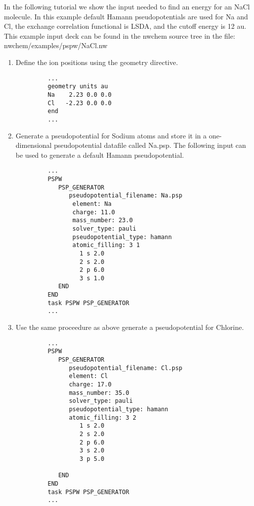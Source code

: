 In the following tutorial we show the input needed to find an
energy for an NaCl molecule.  In this example default Hamann pseudopotentials
are used for Na and Cl, the exchange correlation functional is LSDA, and
the cutoff energy is 12 au.  This example input deck can be found in the nwchem
source tree in the file: nwchem/examples/pspw/NaCl.nw
\begin{enumerate}
\item Define the ion positions using the geometry directive.
 \tiny     \begin{verbatim}
         ...
         geometry units au 
         Na    2.23 0.0 0.0
         Cl   -2.23 0.0 0.0
         end
         ...
      \end{verbatim}
\normalsize
\item Generate a pseudopotential for Sodium atoms and store it in a
      one-dimensional pseudopotential datafile called Na.psp.  
      The following input can be used to generate a default
      Hamann pseudopotential.  
 \tiny     \begin{verbatim}
         ...
         PSPW
            PSP_GENERATOR
               pseudopotential_filename: Na.psp
                element: Na
                charge: 11.0
                mass_number: 23.0
                solver_type: pauli
                pseudopotential_type: hamann
                atomic_filling: 3 1
                  1 s 2.0
                  2 s 2.0
                  2 p 6.0
                  3 s 1.0
            END
         END
         task PSPW PSP_GENERATOR
         ...
      \end{verbatim}
\normalsize
\item Use the same proceedure as above generate a pseudopotential 
      for Chlorine. 
 \tiny     \begin{verbatim}
         ...
         PSPW 
            PSP_GENERATOR
               pseudopotential_filename: Cl.psp
               element: Cl
               charge: 17.0
               mass_number: 35.0
               solver_type: pauli
               pseudopotential_type: hamann
               atomic_filling: 3 2
                  1 s 2.0
                  2 s 2.0
                  2 p 6.0
                  3 s 2.0
                  3 p 5.0
            
            END
         END
         task PSPW PSP_GENERATOR
         ...
      \end{verbatim}
\normalsize


\end{enumerate}
